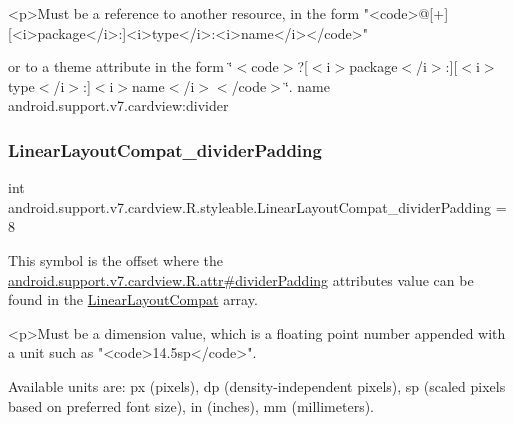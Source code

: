 \begin{DoxyVerb}      <p>Must be a reference to another resource, in the form "<code>@[+][<i>package</i>:]<i>type</i>:<i>name</i></code>"
\end{DoxyVerb}
 or to a theme attribute in the form \char`\"{}$<$code$>$?\mbox{[}$<$i$>$package$<$/i$>$\+:\mbox{]}\mbox{[}$<$i$>$type$<$/i$>$\+:\mbox{]}$<$i$>$name$<$/i$>$$<$/code$>$\char`\"{}.  name android.\+support.\+v7.\+cardview\+:divider \mbox{\label{classandroid_1_1support_1_1v7_1_1cardview_1_1R_1_1styleable_adab5ae000e1bad33383cace0ae37b88f}} 
\subsubsection{\texorpdfstring{Linear\+Layout\+Compat\+\_\+divider\+Padding}{LinearLayoutCompat\_dividerPadding}}
{\footnotesize\ttfamily int android.\+support.\+v7.\+cardview.\+R.\+styleable.\+Linear\+Layout\+Compat\+\_\+divider\+Padding = 8\hspace{0.3cm}{\ttfamily [static]}}

This symbol is the offset where the \hyperlink{classandroid_1_1support_1_1v7_1_1cardview_1_1R_1_1attr_a1f45ca6be4199a2786b81427253f369b}{android.\+support.\+v7.\+cardview.\+R.\+attr\#divider\+Padding} attribute\textquotesingle{}s value can be found in the \hyperlink{classandroid_1_1support_1_1v7_1_1cardview_1_1R_1_1styleable_a700813433e97ff82dc1f2263b2072586}{Linear\+Layout\+Compat} array.

\begin{DoxyVerb}      <p>Must be a dimension value, which is a floating point number appended with a unit such as "<code>14.5sp</code>".
\end{DoxyVerb}
 Available units are\+: px (pixels), dp (density-\/independent pixels), sp (scaled pixels based on preferred font size), in (inches), mm (millimeters). 


